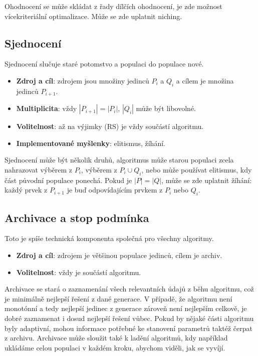 Ohodnocení se může skládat z řady dílčích ohodnocení, je zde možnost vícekriteriální optimalizace. Může se zde uplatnit niching.

\subsection{Sjednocení}

Sjednocení slučuje staré potomstvo a populaci do populace nové.
\begin{itemize}
  \item \textbf{Zdroj a cíl}: zdrojem jsou množiny jedinců $P_i$ a $Q_i$ a cílem je množina jedinců $P_{i+1}$.
  \item \textbf{Multiplicita}: vždy $|P_{i+1}| = |P_i|$, $|Q_i|$ může být libovolné.
  \item \textbf{Volitelnost}: až na výjimky (RS) je vždy součástí algoritmu.
  \item \textbf{Implementované myšlenky}: elitismus, žíhání.
\end{itemize}

Sjednocení může být několik druhů, algoritmus může starou populaci zcela nahrazovat výběrem z $P_i$, výběrem z $P_i \cup Q_i$, nebo může používat elitismus, kdy část původní populace ponechá. Pokud je $|P| = |Q|$, může se zde uplatnit žíhání: každý prvek z $P_{i+1}$ je buď odpovídajícím prvkem z $P_i$ nebo $Q_i$.

\subsection{Archivace a stop podmínka}

Toto je spíše technická komponenta společná pro všechny algoritmy.
\begin{itemize}
  \item \textbf{Zdroj a cíl}: zdrojem je většinou populace jedinců, cílem je archiv.
  \item \textbf{Volitelnost}: vždy je součástí algoritmu.
\end{itemize}

Archivace se stará o zaznamenání všech relevantních údajů z běhu algoritmu, což je minimálně nejlepší řešení z dané generace. V případě, že algoritmu není monotónní a tedy nejlepší jedinec z generace zároveň není nejlepším celkově, je dobré zaznamenat i dosud nejlepší řešení vůbec. Pokud by nějaké části algoritmu byly adaptivní, mohou informace potřebné ke stanovení parametrů taktéž čerpat z archivu. Archivace může sloužit také k ladění algoritmů, kdy například ukládáme celou populaci v každém kroku, abychom viděli, jak se vyvíjí.

